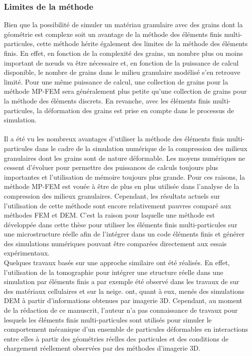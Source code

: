 		\subsubsection{Limites de la méthode}
			Bien que la possibilité de simuler un matériau granulaire avec des grains dont la géométrie est complexe soit un avantage de la méthode des éléments finis multi-particules, cette méthode hérite également des limites de la méthode des éléments finis. En effet, en fonction de la complexité des grains, un nombre plus ou moins important de n\oe{}uds va être nécessaire et, en fonction de la puissance de calcul disponible, le nombre de grains dans le milieu granulaire modélisé s'en retrouve limité. Pour une même puissance de calcul, une collection de grains pour la méthode MP-FEM sera généralement plus petite qu'une collection de grains pour la méthode des éléments discrets. En revanche, avec les éléments finis multi-particules, la déformation des grains est prise en compte dans le processus de simulation.
		
		\paragraph{}
		Il a été vu les nombreux avantages d'utiliser la méthode des éléments finis multi-particules dans le cadre de la simulation numérique de la compression des milieux granulaires dont les grains sont de nature déformable. Les moyens numériques ne cessent d'évoluer pour permettre des puissances de calculs toujours plus importantes et l'utilisation de mémoire toujours plus grande. Pour ces raisons, la méthode MP-FEM est vouée à être de plus en plus utilisée dans l'analyse de la compression des milieux granulaires. Cependant, les résultats actuels sur l'utilisation de cette méthode sont encore relativement pauvres comparé aux méthodes FEM et DEM. C'est la raison pour laquelle une méthode est développée dans cette thèse pour utiliser les éléments finis multi-particules sur une microstructure réelle afin de l'intégrer dans un code éléments finis et générer des simulations numériques pouvant être comparées directement aux essais expérimentaux.
		\\Quelques travaux basés sur une approche similaire ont été réalisés. En effet, l'utilisation de la tomographie pour intégrer une structure réelle dans une simulation par éléments finis a par exemple été observé dans les travaux de \citet{youssef_finite_2005} sur des matériaux cellulaires et \citet{wautier_linking_2015} sur la neige.  ont, quant à eux, menés des simulations DEM à partir d'informations obtenues par imagerie 3D. Cependant, au moment de la rédaction de ce manuscrit, l'auteur n'a pas connaissance de travaux pour lesquels les éléments finis multi-particules sont utilisés pour simuler le comportement mécanique d'un ensemble de particules déformables en interactions entre elles à partir des géométries réelles des particules et des conditions de chargement réellement observées par des méthodes d'imagerie 3D.